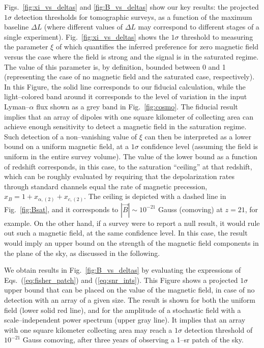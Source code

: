 Figs.~\ref{fig:xi_vs_deltas} and \ref{fig:B_vs_deltas} show our key results: the projected $1\sigma$ detection thresholds for tomographic surveys, as a function of the maximum baseline $\Delta L$ (where different values of $\Delta L$ may correspond to different stages of a single experiment). Fig.~\ref{fig:xi_vs_deltas} shows the $1\sigma$ threshold to measuring the parameter $\xi$ of \eq{\ref{eq:saturated_P}} which quantifies the inferred preference for zero magnetic field versus the case where the field is strong and the signal is in the saturated regime. The value of this parameter is, by definition, bounded between 0 and 1 (representing the case of no magnetic field and the saturated case, respectively). In this Figure, the solid line corresponds to our fiducial calculation, while the light--colored band around it corresponds to the level of variation in the input Lyman--$\alpha$ flux shown as a grey band in Fig.~\ref{fig:cosmo}. The fiducial result implies that an array of dipoles with one square kilometer of collecting area can achieve enough sensitivity to detect a magnetic field in the saturation regime. Such detection of a non--vanishing value of $\xi$ can then be interpreted as a lower bound on a uniform magnetic field, at a $1\sigma$ confidence level (assuming the field is uniform in the entire survey volume). The value of the lower bound as a function of redshift  corresponds, in this case, to the saturation ``ceiling'' at that redshift, which can be roughly evaluated by requiring that the depolarization rates through standard channels equal the rate of magnetic precession, $x_B = 1+x_{\alpha ,(2)} +x_{c,(2)}$. The ceiling is depicted with a dashed line in Fig.~\ref{fig:Bsat}, and it corresponds to $|\vec B|\sim 10^{-21}$ Gauss (comoving) at $z=21$, for example.  On the other hand, if a survey were to report a null result, it would rule out such a magnetic field, at the same confidence level. In this case, the result would imply an upper bound on the strength of the magnetic field components in the plane of the sky, as discussed in the following. 

We obtain results in Fig.~\ref{fig:B_vs_deltas} by evaluating the expressions of Eqs.~(\ref{eq:fisher_patch}) and (\ref{eq:snr_ints}). This Figure shows a projected $1\sigma$ upper bound that can be placed on the value of the magnetic field, in case of no detection with an array of a given size. The result is shown for both the uniform field (lower solid red line), and for the amplitude of a stochastic field with a scale--independent power spectrum (upper gray line). It implies that an array with one square kilometer collecting area may reach a $1\sigma$ detection threshold of $10^{-21}$ Gauss comoving, after three years of observing a 1--sr patch of the sky. 

